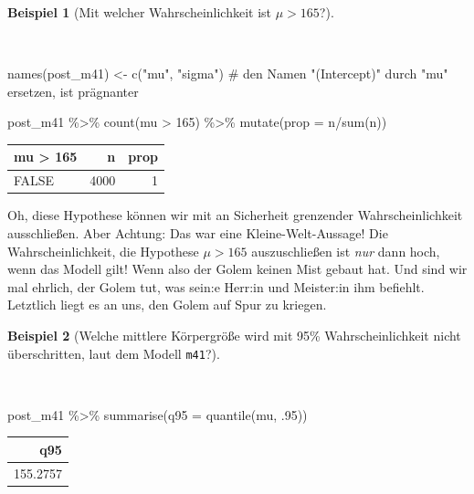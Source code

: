 \documentclass[
  a4paper,
  DIV=11]{scrreprt}
\newenvironment{Shaded}{\begin{snugshade}}{\end{snugshade}}
\newcommand{\AttributeTok}[1]{\textcolor[rgb]{0.40,0.45,0.13}{#1}}
\newcommand{\CommentTok}[1]{\textcolor[rgb]{0.37,0.37,0.37}{#1}}
\newcommand{\DecValTok}[1]{\textcolor[rgb]{0.68,0.00,0.00}{#1}}
\newcommand{\FunctionTok}[1]{\textcolor[rgb]{0.28,0.35,0.67}{#1}}
\newcommand{\NormalTok}[1]{\textcolor[rgb]{0.00,0.23,0.31}{#1}}
\newcommand{\OtherTok}[1]{\textcolor[rgb]{0.00,0.23,0.31}{#1}}
\newcommand{\SpecialCharTok}[1]{\textcolor[rgb]{0.37,0.37,0.37}{#1}}
\newcommand{\StringTok}[1]{\textcolor[rgb]{0.13,0.47,0.30}{#1}}
\theoremstyle{definition}
\newtheorem{example}{Beispiel}[chapter]
\theoremstyle{remark}
\begin{document}
\leavevmode{}%
\begin{example}[Mit welcher Wahrscheinlichkeit ist
\(\mu>165\)?]\label{exm-kung2}

~

\begin{Shaded}
\begin{Highlighting}[]
\FunctionTok{names}\NormalTok{(post\_m41) }\OtherTok{\textless{}{-}} 
  \FunctionTok{c}\NormalTok{(}\StringTok{"mu"}\NormalTok{, }\StringTok{"sigma"}\NormalTok{)  }\CommentTok{\# den Namen "(Intercept)" durch "mu" ersetzen, ist prägnanter}

\NormalTok{post\_m41 }\SpecialCharTok{\%\textgreater{}\%} 
  \FunctionTok{count}\NormalTok{(mu }\SpecialCharTok{\textgreater{}} \DecValTok{165}\NormalTok{) }\SpecialCharTok{\%\textgreater{}\%} 
  \FunctionTok{mutate}\NormalTok{(}\AttributeTok{prop =}\NormalTok{ n}\SpecialCharTok{/}\FunctionTok{sum}\NormalTok{(n))}
\end{Highlighting}
\end{Shaded}

\begin{longtable}[]{@{}lrr@{}}
\toprule()
mu \textgreater{} 165 & n & prop \\
\midrule()
\endhead
FALSE & 4000 & 1 \\
\bottomrule()
\end{longtable}

Oh, diese Hypothese können wir mit an Sicherheit grenzender
Wahrscheinlichkeit ausschließen. Aber Achtung: Das war eine
Kleine-Welt-Aussage! Die Wahrscheinlichkeit, die Hypothese \(\mu > 165\)
auszuschließen ist \emph{nur} dann hoch, wenn das Modell gilt! Wenn also
der Golem keinen Mist gebaut hat. Und sind wir mal ehrlich, der Golem
tut, was sein:e Herr:in und Meister:in ihm befiehlt. Letztlich liegt es
an uns, den Golem auf Spur zu kriegen.

\end{example}

\leavevmode{}%
\begin{example}[Welche mittlere Körpergröße wird mit 95\%
Wahrscheinlichkeit nicht überschritten, laut dem Modell
\texttt{m41}?]\label{exm-kung3}

~

\begin{Shaded}
\begin{Highlighting}[]
\NormalTok{post\_m41 }\SpecialCharTok{\%\textgreater{}\%} 
  \FunctionTok{summarise}\NormalTok{(}\AttributeTok{q95 =} \FunctionTok{quantile}\NormalTok{(mu, .}\DecValTok{95}\NormalTok{))}
\end{Highlighting}
\end{Shaded}

\begin{longtable}[]{@{}r@{}}
\toprule()
q95 \\
\midrule()
\endhead
155.2757 \\
\bottomrule()
\end{longtable}

\end{example}
\end{document}
